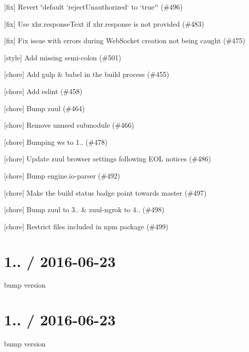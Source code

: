 \begin{DoxyItemize}
\item \mbox{[}fix\mbox{]} Revert \char`\"{}default `reject\+Unauthorized` to `true`\char`\"{} (\#496)
\item \mbox{[}fix\mbox{]} Use xhr.\+response\+Text if xhr.\+response is not provided (\#483)
\item \mbox{[}fix\mbox{]} Fix issue with errors during Web\+Socket creation not being caught (\#475)
\item \mbox{[}style\mbox{]} Add missing semi-\/colon (\#501)
\item \mbox{[}chore\mbox{]} Add gulp \& babel in the build process (\#455)
\item \mbox{[}chore\mbox{]} Add eslint (\#458)
\item \mbox{[}chore\mbox{]} Bump zuul (\#464)
\item \mbox{[}chore\mbox{]} Remove unused submodule (\#466)
\item \mbox{[}chore\mbox{]} Bumping ws to 1.. (\#478)
\item \mbox{[}chore\mbox{]} Update zuul browser settings following E\+OL notices (\#486)
\item \mbox{[}chore\mbox{]} Bump engine.\+io-\/parser (\#492)
\item \mbox{[}chore\mbox{]} Make the build status badge point towards master (\#497)
\item \mbox{[}chore\mbox{]} Bump zuul to 3.. \& zuul-\/ngrok to 4.. (\#498)
\item \mbox{[}chore\mbox{]} Restrict files included in npm package (\#499)
\end{DoxyItemize}

\section*{1.. / 2016-\/06-\/23 }


\begin{DoxyItemize}
\item bump version
\end{DoxyItemize}

\section*{1.. / 2016-\/06-\/23 }


\begin{DoxyItemize}
\item bump version
\end{DoxyItemize}

